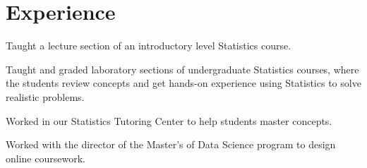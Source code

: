 \documentclass[letterpaper]{deedy-resume} %
\begin{document}
\hfill
%
%
\begin{minipage}[t]{0.63\textwidth} %


\section{Experience}

\vspace{\topsep} %
\begin{tightitemize}
\item Taught a lecture section of an introductory level Statistics course.
\item Taught and graded laboratory sections of undergraduate Statistics
  courses, where the students review concepts and get hands-on experience
  using Statistics to solve realistic
  problems. 
\item Worked in our Statistics Tutoring
  Center to help students master 
  concepts.
\item Worked with the director of the Master's of Data Science program
  to design online coursework.
\end{tightitemize}


\end{minipage}
\end{document}
